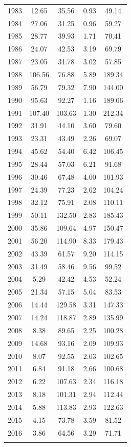 \documentclass[12pt,]{article}
\begin{document}
\begin{longtable}{ccccc}
  1983 & 12.65 & 35.56 & 0.93 & 49.14 \\ 
  1984 & 27.06 & 31.25 & 0.96 & 59.27 \\ 
  1985 & 28.77 & 39.93 & 1.71 & 70.41 \\ 
  1986 & 24.07 & 42.53 & 3.19 & 69.79 \\ 
  1987 & 23.05 & 31.78 & 3.02 & 57.85 \\ 
  1988 & 106.56 & 76.88 & 5.89 & 189.34 \\ 
  1989 & 56.79 & 79.32 & 7.90 & 144.00 \\ 
  1990 & 95.63 & 92.27 & 1.16 & 189.06 \\ 
  1991 & 107.40 & 103.63 & 1.30 & 212.34 \\ 
  1992 & 31.91 & 44.10 & 3.60 & 79.60 \\ 
  1993 & 23.31 & 43.49 & 2.26 & 69.07 \\ 
  1994 & 45.62 & 54.40 & 6.42 & 106.45 \\ 
  1995 & 28.44 & 57.03 & 6.21 & 91.68 \\ 
  1996 & 30.46 & 67.48 & 4.00 & 101.93 \\ 
  1997 & 24.39 & 77.23 & 2.62 & 104.24 \\ 
  1998 & 32.12 & 75.91 & 2.08 & 110.11 \\ 
  1999 & 50.11 & 132.50 & 2.83 & 185.43 \\ 
  2000 & 35.86 & 109.64 & 4.97 & 150.47 \\ 
  2001 & 56.20 & 114.90 & 8.33 & 179.43 \\ 
  2002 & 43.39 & 61.57 & 9.20 & 114.15 \\ 
  2003 & 31.49 & 58.46 & 9.56 & 99.52 \\ 
  2004 & 5.29 & 42.42 & 4.53 & 52.24 \\ 
  2005 & 21.34 & 57.15 & 5.04 & 83.53 \\ 
  2006 & 14.44 & 129.58 & 3.31 & 147.33 \\ 
  2007 & 14.24 & 118.87 & 2.89 & 135.99 \\ 
  2008 & 8.38 & 89.65 & 2.25 & 100.28 \\ 
  2009 & 14.68 & 93.16 & 2.09 & 109.93 \\ 
  2010 & 8.07 & 92.55 & 2.03 & 102.65 \\ 
  2011 & 6.84 & 91.18 & 2.66 & 100.68 \\ 
  2012 & 6.22 & 107.63 & 2.34 & 116.18 \\ 
  2013 & 8.18 & 101.31 & 2.94 & 112.44 \\ 
  2014 & 5.88 & 113.83 & 2.93 & 122.63 \\ 
  2015 & 4.15 & 73.78 & 3.59 & 81.52 \\ 
  2016 & 3.86 & 64.56 & 3.29 & 71.71 \\ 
   \hline
\hline
\label{tab:Rec_removal}
\end{longtable}
\end{document}
